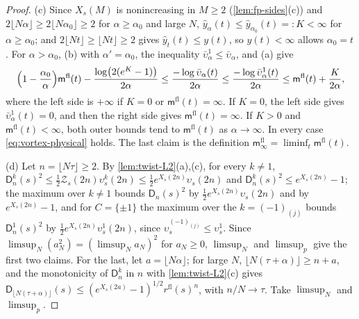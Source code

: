 \documentclass[11pt,a4paper]{amsart}
\theoremstyle{definition}
\theoremstyle{remark}
\numberwithin{equation}{section}
\newcommand{\TT}{\mathbb{T}}               %
\newcommand{\Zc}{\mathcal{Z}}              %
\newcommand{\Zs}[2]{\Zc_{#1}(#2)}          %
\newcommand{\XT}[2]{X_{#1}(#2)}            %
\begin{document}
\begin{proof}
(c) Since $\XT{s}{M}$ is nonincreasing in $M\ge2$ (\cref{lem:fp-sides}\textup{(c)}) and $2\lfloor N\alpha\rfloor\ge2\lfloor N\alpha_0\rfloor\ge2$ for $\alpha\ge\alpha_0$ and large $N$, $\hat y_\alpha(t)\le\hat y_{\alpha_0}(t)=:K<\infty$ for $\alpha\ge\alpha_0$; and $2\lfloor Nt\rfloor\ge\lfloor Nt\rfloor\ge2$ gives $\hat y_t(t)\le y(t)$, so $y(t)<\infty$ allows $\alpha_0=t$. For $\alpha>\alpha_0$, (b) with $\alpha'=\alpha_0$, the inequality $\bar\upsilon^1_\alpha\le\bar\upsilon_\alpha$, and (a) give
\[
\Bigl(1-\frac{\alpha_0}\alpha\Bigr)\mathsf m^{\mathrm{fl}}(t)-\frac{\log\bigl(2(e^K-1)\bigr)}{2\alpha}\le\frac{-\log\bar\upsilon_\alpha(t)}{2\alpha}\le\frac{-\log\bar\upsilon^1_\alpha(t)}{2\alpha}\le\mathsf m^{\mathrm{fl}}(t)+\frac K{2\alpha},
\]
where the left side is $+\infty$ if $K=0$ or $\mathsf m^{\mathrm{fl}}(t)=\infty$. If $K=0$, the left side gives $\bar\upsilon^1_\alpha(t)=0$, and then the right side gives $\mathsf m^{\mathrm{fl}}(t)=\infty$. If $K>0$ and $\mathsf m^{\mathrm{fl}}(t)<\infty$, both outer bounds tend to $\mathsf m^{\mathrm{fl}}(t)$ as $\alpha\to\infty$. In every case \eqref{eq:vortex-physical} holds. The last claim is the definition $\mathsf m^{\mathrm{fl}}_\infty=\liminf_t\mathsf m^{\mathrm{fl}}(t)$.

(d) Let $n=\lfloor N\tau\rfloor\ge2$. By \cref{lem:twist-L2}\textup{(a),(c)}, for every $k\ne1$, $\mathsf D^k_n(s)^2\le\frac12\Zs{s}{2n}\upsilon^k_s(2n)\le\frac12e^{\XT{s}{2n}}\upsilon_s(2n)$ and $\mathsf D^k_n(s)^2\le e^{\XT{s}{2n}}-1$; the maximum over $k\ne1$ bounds $\mathsf D_n(s)^2$ by $\frac12e^{\XT{s}{2n}}\upsilon_s(2n)$ and by $e^{\XT{s}{2n}}-1$, and for $C=\{\pm1\}$ the maximum over the $k=(-1)_{(j)}$ bounds $\mathsf D^1_n(s)^2$ by $\frac12e^{\XT{s}{2n}}\upsilon^1_s(2n)$, since $\upsilon^{(-1)_{(j)}}_s\le\upsilon^1_s$. Since $\limsup_N(a_N^2)=(\limsup_Na_N)^2$ for $a_N\ge0$, $\limsup_N$ and $\limsup_p$ give the first two claims. For the last, let $a=\lfloor N\alpha\rfloor$; for large $N$, $\lfloor N(\tau+\alpha)\rfloor\ge n+a$, and the monotonicity of $\mathsf D^k_n$ in $n$ with \cref{lem:twist-L2}\textup{(c)} gives $\mathsf D_{\lfloor N(\tau+\alpha)\rfloor}(s)\le(e^{\XT{s}{2a}}-1)^{1/2}r^{\mathrm{fl}}(s)^n$, with $n/N\to\tau$. Take $\limsup_N$ and $\limsup_p$.
\end{proof}
\end{document}
